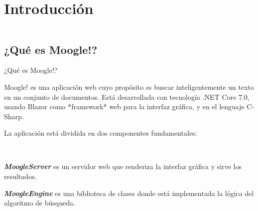 \section{Introducción}\label{intro}

\begin{frame}
    \begin{columns}[t]
        \begin{column}{.5\textwidth}
          \tableofcontents[sections={1-2},currentsection]
        \end{column}
        \begin{column}{.5\textwidth}
          \tableofcontents[sections={3-4},currentsection]
        \end{column}
    \end{columns}
\end{frame}

\subsection{¿Qué es Moogle!?}

\begin{frame}{¿Qué es Moogle!?}

\begin{center}
  Moogle! es una aplicación web cuyo propósito es buscar inteligentemente un texto en un conjunto de documentos. 
  Está desarrollada con tecnología .NET Core 7.0, usando Blazor como 
  *framework* web para la interfaz gráfica, y en el lenguaje C-Sharp.
\end{center}

\pause

  
\begin{center}
  La aplicación está dividida en dos componentes fundamentales:


  \ 


\textit{\textbf{MoogleServer}} es un servidor web que renderiza la interfaz gráfica y sirve los resultados.


\textit{\textbf{MoogleEngine}} es una biblioteca de clases donde está implementada la lógica 
del algoritmo de búsqueda.

\end{center}

\end{frame}


